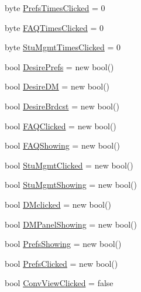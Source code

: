 \begin{DoxyCompactItemize}
\item 
byte \hyperlink{class_sr_p___classroom_inq_1_1frm_classrrom_inq_a649306fdbca853561ee4a6cac829315a}{\-Prefs\-Times\-Clicked} = 0
\item 
byte \hyperlink{class_sr_p___classroom_inq_1_1frm_classrrom_inq_a81d1b27ebc720a6da339e1816eab4dfa}{\-F\-A\-Q\-Times\-Clicked} = 0
\item 
byte \hyperlink{class_sr_p___classroom_inq_1_1frm_classrrom_inq_a8746b34d859922daf9b2d5b00cef317e}{\-Stu\-Mgmt\-Times\-Clicked} = 0
\item 
bool \hyperlink{class_sr_p___classroom_inq_1_1frm_classrrom_inq_a263bbbace2f9c25e5f92573e5f4845ba}{\-Desire\-Prefs} = new bool()
\item 
bool \hyperlink{class_sr_p___classroom_inq_1_1frm_classrrom_inq_a8f8f9bb905b290fa448b445560458f89}{\-Desire\-D\-M} = new bool()
\item 
bool \hyperlink{class_sr_p___classroom_inq_1_1frm_classrrom_inq_ab67298a2e18c70080e8cc5e604223679}{\-Desire\-Brdcst} = new bool()
\item 
bool \hyperlink{class_sr_p___classroom_inq_1_1frm_classrrom_inq_a2b3fd84c890215dd61c54946b49906d2}{\-F\-A\-Q\-Clicked} = new bool()
\item 
bool \hyperlink{class_sr_p___classroom_inq_1_1frm_classrrom_inq_a37a892198dda5bfa752c66df2debb199}{\-F\-A\-Q\-Showing} = new bool()
\item 
bool \hyperlink{class_sr_p___classroom_inq_1_1frm_classrrom_inq_ad0a57ebb96913cfbb9622d8c4c7b52cb}{\-Stu\-Mgmt\-Clicked} = new bool()
\item 
bool \hyperlink{class_sr_p___classroom_inq_1_1frm_classrrom_inq_a6a40312dc72ead57d8d40d415ee14a07}{\-Stu\-Mgmt\-Showing} = new bool()
\item 
bool \hyperlink{class_sr_p___classroom_inq_1_1frm_classrrom_inq_a663c3385393ae39a41bd647632ba4617}{\-D\-Mclicked} = new bool()
\item 
bool \hyperlink{class_sr_p___classroom_inq_1_1frm_classrrom_inq_a7a4d3ad70d4284ad3f7d8ab3ca8718e0}{\-D\-M\-Panel\-Showing} = new bool()
\item 
bool \hyperlink{class_sr_p___classroom_inq_1_1frm_classrrom_inq_a915bf1ba42b54c697d1d90043610385f}{\-Prefs\-Showing} = new bool()
\item 
bool \hyperlink{class_sr_p___classroom_inq_1_1frm_classrrom_inq_a9e5a6ce376468f2e13dae9f60e86ccf6}{\-Prefs\-Clicked} = new bool()
\item 
bool \hyperlink{class_sr_p___classroom_inq_1_1frm_classrrom_inq_a567cf412a542927bb47984c0e835a7d2}{\-Conv\-View\-Clicked} = false

\end{DoxyCompactItemize}
